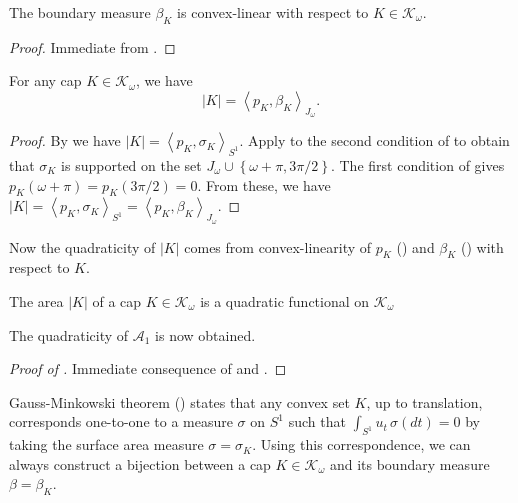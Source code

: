 \begin{proposition}

The boundary measure \(\beta_K\) is convex-linear with respect to \(K \in \mathcal{K}_\omega\).

\label{pro:boundary-measure-linear}
\end{proposition}

\begin{proof}
Immediate from .
\end{proof}

\begin{proposition}

For any cap \(K \in \mathcal{K}_\omega\), we have
\[
|K| = \left< p_K, \beta_K \right>_{J_\omega}.
\]

\label{pro:boundary-measure-area}
\end{proposition}

\begin{proof}
By  we have \(|K| = \left< p_K, \sigma_K \right>_{S^1}\). Apply  to the second condition of  to obtain that \(\sigma_K\) is supported on the set \(J_{\omega} \cup \left\{ \omega + \pi, 3\pi/2 \right\}\). The first condition of  gives \(p_K(\omega + \pi) = p_K(3\pi/2) = 0\). From these, we have \(|K| = \left< p_K, \sigma_K \right>_{S^1} = \left< p_K, \beta_K \right>_{J_\omega}\).
\end{proof}

Now the quadraticity of \(|K|\) comes from convex-linearity of \(p_K\) () and \(\beta_K\) () with respect to \(K\).

\begin{corollary}

The area \(|K|\) of a cap \(K \in \mathcal{K}_{\omega}\) is a quadratic functional on \(\mathcal{K}_\omega\)

\label{cor:area-quadratic-functional}
\end{corollary}

The quadraticity of \(\mathcal{A}_1\) is now obtained.

\begin{proof}[Proof of ]
Immediate consequence of  and .
\end{proof}

Gauss-Minkowski theorem () states that any convex set \(K\), up to translation, corresponds one-to-one to a measure \(\sigma\) on \(S^1\) such that \(\int_{S^1}u_t\,\sigma(dt) = 0\) by taking the surface area measure \(\sigma = \sigma_K\). Using this correspondence, we can always construct a bijection between a cap \(K \in \mathcal{K}_\omega\) and its boundary measure \(\beta = \beta_K\).

